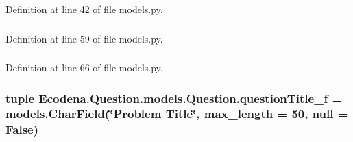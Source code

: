 Definition at line 42 of file models.py.

\hypertarget{class_ecodena_1_1_question_1_1models_1_1_question_afbbad3df2af71e795a4397ae19f1433d}{
\subsubsection[{questionText\_\-f}]{}}
\label{d1/d67/class_ecodena_1_1_question_1_1models_1_1_question_afbbad3df2af71e795a4397ae19f1433d}


Definition at line 59 of file models.py.

\hypertarget{class_ecodena_1_1_question_1_1models_1_1_question_acece4b7c3af5411b6521468bfd308a38}{
\subsubsection[{questionTitle\_\-f}]{}}
\label{d1/d67/class_ecodena_1_1_question_1_1models_1_1_question_acece4b7c3af5411b6521468bfd308a38}


Definition at line 66 of file models.py.

\hypertarget{class_ecodena_1_1_question_1_1models_1_1_question_a512bdc07c3ee6ad6f64bf06810cdbd77}{
\subsubsection[{questionTitle\_\-f}]{\setlength{\rightskip}{0pt plus 5cm}tuple {\bf Ecodena.Question.models.Question.questionTitle\_\-f} = models.CharField(\char`\"{}Problem Title\char`\"{}, max\_\-length = 50, null = False)}}
\label{d1/d67/class_ecodena_1_1_question_1_1models_1_1_question_a512bdc07c3ee6ad6f64bf06810cdbd77}


